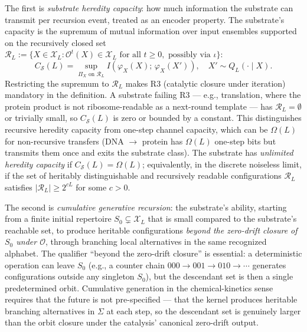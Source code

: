 \documentclass[aps,prx,reprint,amsmath,amssymb,floatfix,superscriptaddress,nofootinbib]{revtex4-2}
\theoremstyle{plain-thm}
\theoremstyle{definition-thm}
\newcommand{\Csub}{C_{\mathcal{S}}}
\newcommand{\descX}{\varphi_X}
\newcommand{\Xset}{\mathcal{X}}
\newcommand{\Op}{\mathcal{O}}
\newcommand{\Reach}{\mathcal{R}}
\begin{document}
The first is \emph{substrate heredity capacity}: how much information the substrate can transmit per recursion event, treated as an encoder property. The substrate's capacity is the supremum of mutual information over input ensembles supported on the recursively closed set $\mathcal{R}_L := \{X \in \Xset_L : \Op^t(X) \in \Xset_L \text{ for all } t \ge 0, \text{ possibly via } \iota\}$:
\begin{equation}
\Csub(L) = \sup_{\Pi_X \text{ on } \mathcal{R}_L} I\!\left(\descX(X);\, \descX(X')\right), \quad X' \sim Q_L(\cdot \mid X).
\label{eq:capacity}
\end{equation}
Restricting the supremum to $\mathcal{R}_L$ makes R3 (catalytic closure under iteration) mandatory in the definition. A substrate failing R3 --- e.g., translation, where the protein product is not ribosome-readable as a next-round template --- has $\mathcal{R}_L = \emptyset$ or trivially small, so $\Csub(L)$ is zero or bounded by a constant. This distinguishes recursive heredity capacity from one-step channel capacity, which can be $\Omega(L)$ for non-recursive transfers (DNA $\to$ protein has $\Omega(L)$ one-step bits but transmits them once and exits the substrate class). The substrate has \emph{unlimited heredity capacity} if $\Csub(L) = \Omega(L)$; equivalently, in the discrete noiseless limit, if the set of heritably distinguishable and recursively readable configurations $\Reach_L$ satisfies $|\Reach_L| \ge 2^{cL}$ for some $c > 0$.

The second is \emph{cumulative generative recursion}: the substrate's ability, starting from a finite initial repertoire $S_0 \subsetneq \Xset_L$ that is small compared to the substrate's reachable set, to produce heritable configurations \emph{beyond the zero-drift closure of $S_0$ under $\Op$}, through branching local alternatives in the same recognized alphabet. The qualifier ``beyond the zero-drift closure'' is essential: a deterministic operation can leave $S_0$ (e.g., a counter chain $000 \to 001 \to 010 \to \cdots$ generates configurations outside any singleton $S_0$), but the descendant set is then a single predetermined orbit. Cumulative generation in the chemical-kinetics sense requires that the future is not pre-specified --- that the kernel produces heritable branching alternatives in $\Sigma$ at each step, so the descendant set is genuinely larger than the orbit closure under the catalysis' canonical zero-drift output.
\end{document}
